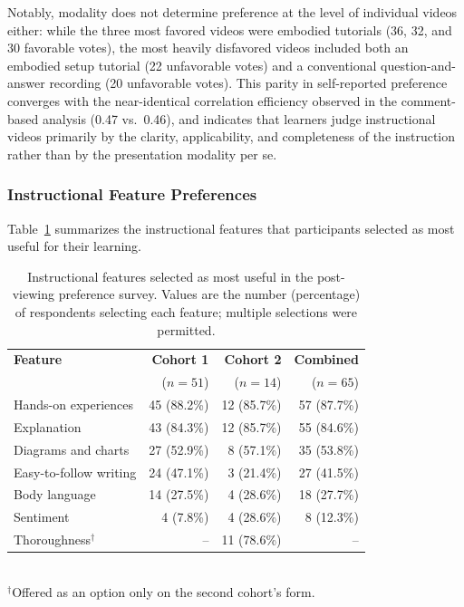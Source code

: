 Notably, modality does not determine preference at the level of individual videos either: while the three most favored videos were embodied tutorials (36, 32, and 30 favorable votes), the most heavily disfavored videos included both an embodied setup tutorial (22 unfavorable votes) and a conventional question-and-answer recording (20 unfavorable votes). This parity in self-reported preference converges with the near-identical correlation efficiency observed in the comment-based analysis (0.47 vs.\ 0.46), and indicates that learners judge instructional videos primarily by the clarity, applicability, and completeness of the instruction rather than by the presentation modality per se.

\subsubsection{Instructional Feature Preferences}
Table~\ref{tab:survey_features} summarizes the instructional features that participants selected as most useful for their learning.

\begin{table}[h!]
    \centering
    \caption{Instructional features selected as most useful in the post-viewing preference survey. Values are the number (percentage) of respondents selecting each feature; multiple selections were permitted.}
    \begin{tabular}{l r r r}
        \toprule
        \textbf{Feature} & \textbf{Cohort 1} & \textbf{Cohort 2} & \textbf{Combined} \\
        & ($n = 51$) & ($n = 14$) & ($n = 65$) \\
        \midrule
        Hands-on experiences & 45 (88.2\%) & 12 (85.7\%) & 57 (87.7\%) \\
        Explanation & 43 (84.3\%) & 12 (85.7\%) & 55 (84.6\%) \\
        Diagrams and charts & 27 (52.9\%) & 8 (57.1\%) & 35 (53.8\%) \\
        Easy-to-follow writing & 24 (47.1\%) & 3 (21.4\%) & 27 (41.5\%) \\
        Body language & 14 (27.5\%) & 4 (28.6\%) & 18 (27.7\%) \\
        Sentiment & 4 (7.8\%) & 4 (28.6\%) & 8 (12.3\%) \\
        Thoroughness$^{\dagger}$ & -- & 11 (78.6\%) & -- \\
        \bottomrule
    \end{tabular}
    \\[2pt]
    {\footnotesize $^{\dagger}$Offered as an option only on the second cohort's form.}
    \label{tab:survey_features}
\end{table}

